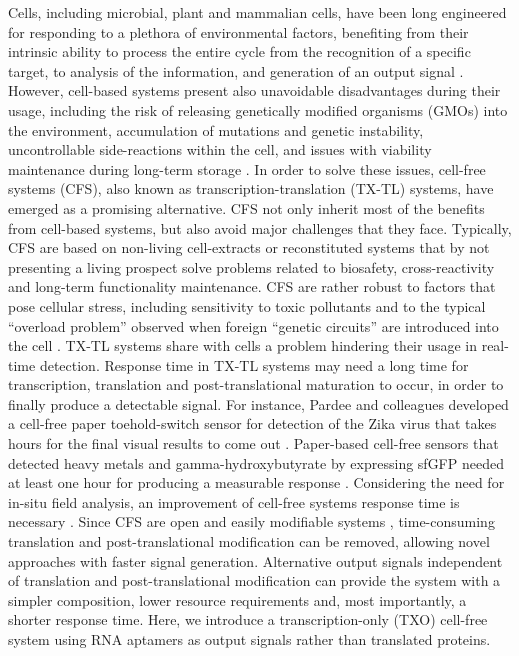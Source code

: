 Cells, including microbial, plant and mammalian cells, have been long engineered for responding to a plethora of environmental factors, benefiting from their intrinsic ability to process the entire cycle from the recognition of a specific target, to analysis of the information, and generation of an output signal \citep{khalil2010synthetic}. However, cell-based systems present also unavoidable disadvantages during their usage, including the risk of releasing genetically modified organisms (GMOs) into the environment, accumulation of mutations and genetic instability, uncontrollable side-reactions within the cell, and issues with viability maintenance during long-term storage \citep{bousse1996whole,gupta2019cell,kaur2015advances, yagi2007applications}.
In order to solve these issues, cell-free systems (CFS), also known as transcription-translation (TX-TL) systems, have emerged as a promising alternative. CFS not only inherit most of the benefits from cell-based systems, but also avoid major challenges that they face. Typically, CFS are based on non-living cell-extracts or reconstituted systems that by not presenting a living prospect solve problems related to biosafety, cross-reactivity and long-term functionality maintenance. CFS are rather robust to factors that pose cellular stress, including sensitivity to toxic pollutants and to the typical “overload problem” observed when foreign “genetic circuits” are introduced into the cell \citep{borkowski2016overloaded}.
TX-TL systems share with cells a problem hindering their usage in real-time detection. Response time in TX-TL systems may need a long time for transcription, translation and post-translational maturation to occur, in order to finally produce a detectable signal. For instance, Pardee and colleagues \citep{pardee2016rapid} developed a cell-free paper toehold-switch sensor for detection of the Zika virus that takes hours for the final visual results to come out \citep{borkowski2016overloaded}. Paper-based cell-free sensors that detected heavy metals and gamma-hydroxybutyrate by expressing sfGFP needed at least one hour for producing a measurable response \citep{grawe2019paper}. Considering the need for in-situ field analysis, an improvement of cell-free systems response time is necessary \citep{ejeian2018biosensors,justino2017recent}.
Since CFS are open and easily modifiable systems \citep{niederholtmeyer2013implementation}, time-consuming translation and post-translational modification can be removed, allowing novel approaches with faster signal generation. Alternative output signals independent of translation and post-translational modification can provide the system with a simpler composition, lower resource requirements and, most importantly, a shorter response time. Here, we introduce a transcription-only (TXO) cell-free system using RNA aptamers as output signals rather than translated proteins.
